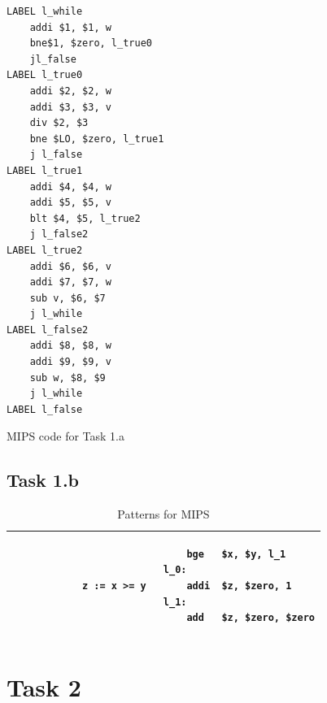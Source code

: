 \documentclass[11pt,a4paper]{article}
\theoremstyle{plain}
\theoremstyle{definition}
\theoremstyle{remark}
\numberwithin{equation}{section}
\begin{document}
\lstset{language=[mips]Assembler}

\begin{code}[H]
	\begin{lstlisting}
LABEL l_while
	addi $1, $1, w
	bne$1, $zero, l_true0
	jl_false
LABEL l_true0
	addi $2, $2, w
	addi $3, $3, v
	div $2, $3
	bne $LO, $zero, l_true1
	j l_false
LABEL l_true1
	addi $4, $4, w
	addi $5, $5, v
	blt $4, $5, l_true2
	j l_false2
LABEL l_true2
	addi $6, $6, v
	addi $7, $7, w
	sub v, $6, $7
	j l_while
LABEL l_false2
	addi $8, $8, w
	addi $9, $9, v
	sub w, $8, $9
	j l_while
LABEL l_false
	\end{lstlisting}
	\caption{MIPS code for Task 1.a}
    \label{code:mips1a}	
\end{code}


\subsection*{Task 1.b}
\begin{table}[H]
	\centering
	\label{my-label}
\begin{tabular}{ |l|l| }
	\hline
	\begin{minipage}{1.2in}
		\begin{verbatim}
			z := x >= y 
		\end{verbatim}
	\end{minipage} &
	\begin{minipage}{3in}
		\begin{lstlisting}
	bge   $x, $y, l_1
l_0: 
	addi  $z, $zero, 1
l_1:
	add   $z, $zero, $zero
		\end{lstlisting}
	\end{minipage} \\ \hline
	\begin{minipage}{1.2in}
		\begin{verbatim}
			w := ! z
		\end{verbatim}
	\end{minipage} &
	\begin{minipage}{3in}
		\begin{lstlisting}
	beq   $z, $zero, l_1
l_0:
	add   $w, $zero, $zero
l_1:
	addi  $w, $zero, 1
		\end{lstlisting}
	\end{minipage} \\ \hline
\end{tabular}
\caption{Patterns for MIPS}
\end{table}
\section*{Task 2}
\end{document}
